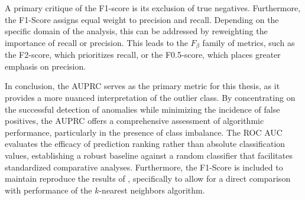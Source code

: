 A primary critique of the F1-score is its exclusion of true negatives. 
Furthermore, the F1-Score assigns equal weight to precision and recall.  
Depending on the specific domain of the analysis, this can be addressed by reweighting the importance of recall or precision. 
This leads to the $F_\beta$ family of metrics, such as the F2-score, which prioritizes recall, or the F0.5-score, which places greater emphasis on precision. 


In conclusion, the AUPRC serves as the primary metric for this thesis, as it provides a more nuanced interpretation of the outlier class. 
By concentrating on the successful detection of anomalies while minimizing the incidence of false positives, the AUPRC offers a comprehensive assessment of algorithmic performance, particularly in the presence of class imbalance. 
The ROC AUC evaluates the efficacy of prediction ranking rather than absolute classification values, establishing a robust baseline against a random classifier that facilitates standardized comparative analyses. 
Furthermore, the F1-Score is included to maintain reproduce the results of \cite{shenkar2022anomaly}, specifically to allow for a direct comparison with performance of the $k$-nearest neighbors algorithm.













